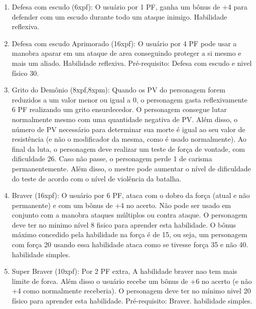\begin{enumerate}
	\item Defesa com escudo (6xpf): O usuário por 1 PF, ganha um bônus de +4 para defender com um escudo durante todo um ataque inimigo.  Habilidade reflexiva.
	
	\item Defesa com escudo Aprimorado (16xpf): O usuário por 4 PF pode usar a manobra aparar em um ataque de area conseguindo proteger a si mesmo e mais um aliado. Habilidade reflexiva. Pré-requisito: Defesa com escudo e nivel físico 30.
	

\item Grito do Demônio (8xpf,8xpm): Quando os PV do personagem forem reduzidos a um valor menor ou igual a 0, o personagem gasta reflexivamente 6 PF realizando um grito ensurdecedor. O personagem consegue lutar normalmente mesmo com uma quantidade negativa de PV. Além disso, o número de PV necessário para determinar sua morte é igual ao seu valor de resistência (e não o modificador da mesma, como é usado normalmente). Ao final da luta, o personagem deve realizar um teste de força de vontade, com dificuldade 26. Caso não passe, o personagem perde 1 de carisma permanentemente. Além disso, o mestre pode aumentar o nível de dificuldade do teste de acordo com o nível de violência da batalha.


	\item Braver (16xpf): O usuário por 6 PF, ataca com o dobro da força (atual e não permanente) e com um bônus de +4 no acerto. Não pode ser usado em conjunto com a manobra ataques múltiplos ou contra ataque. O personagem deve ter no minimo nível 8 fisico para aprender esta habilidade. O bônus máximo concedido pela habilidade na força é de 15, ou seja, um personagem com força 20 usando essa habilidade ataca como se tivesse força 35 e não 40. habilidade simples.

	\item Super Braver (10xpf): Por 2 PF extra, A habilidade braver nao tem mais limite de forca. Além disso o usuário recebe um bônus de +6 no acerto (e não +4 como normalmente receberia). O personagem deve ter no mínimo nivel 20 físico para aprender esta habilidade. Pré-requisito: Braver. habilidade simples.


\end{enumerate}
